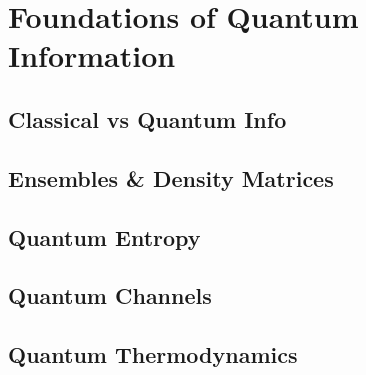 \chapter{Foundations of Quantum Information}

\section{Classical vs Quantum Info}

\section{Ensembles \& Density Matrices}

\section{Quantum Entropy}

\section{Quantum Channels}

\section{Quantum Thermodynamics}






